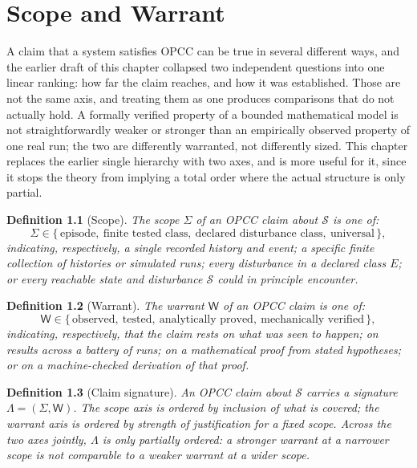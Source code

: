 \documentclass[11pt]{report}
\newtheorem{definition}{Definition}[chapter]
\begin{document}
\chapter{Scope and Warrant}

A claim that a system satisfies OPCC can be true in several different ways, and the earlier draft of this chapter collapsed two independent questions into one linear ranking: how far the claim reaches, and how it was established. Those are not the same axis, and treating them as one produces comparisons that do not actually hold. A formally verified property of a bounded mathematical model is not straightforwardly weaker or stronger than an empirically observed property of one real run; the two are differently warranted, not differently sized. This chapter replaces the earlier single hierarchy with two axes, and is more useful for it, since it stops the theory from implying a total order where the actual structure is only partial.

\begin{definition}[Scope]
The scope $\Sigma$ of an OPCC claim about $\mathcal S$ is one of:
\[
\Sigma \in \{\, \text{episode},\ \text{finite tested class},\ \text{declared disturbance class},\ \text{universal} \,\},
\]
indicating, respectively, a single recorded history and event; a specific finite collection of histories or simulated runs; every disturbance in a declared class $E$; or every reachable state and disturbance $\mathcal S$ could in principle encounter.
\end{definition}

\begin{definition}[Warrant]
The warrant $\mathsf W$ of an OPCC claim is one of:
\[
\mathsf W \in \{\, \text{observed},\ \text{tested},\ \text{analytically proved},\ \text{mechanically verified} \,\},
\]
indicating, respectively, that the claim rests on what was seen to happen; on results across a battery of runs; on a mathematical proof from stated hypotheses; or on a machine-checked derivation of that proof.
\end{definition}

\begin{definition}[Claim signature]
An OPCC claim about $\mathcal S$ carries a signature $\Lambda = (\Sigma, \mathsf W)$. The scope axis is ordered by inclusion of what is covered; the warrant axis is ordered by strength of justification for a fixed scope. Across the two axes jointly, $\Lambda$ is only partially ordered: a stronger warrant at a narrower scope is not comparable to a weaker warrant at a wider scope.
\end{definition}
\end{document}
